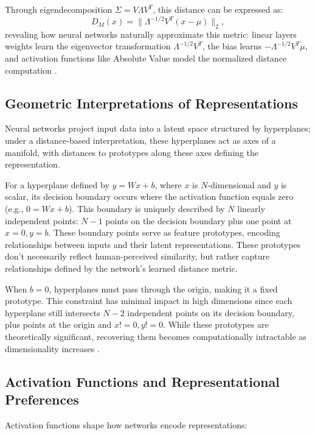 Through eigendecomposition $\Sigma = V\Lambda V^T$, this distance can be expressed as:
\begin{equation}
    D_M(x) = \| \Lambda^{-1/2} V^T (x - \mu) \|_2,
\end{equation}
revealing how neural networks naturally approximate this metric: linear layers weights learn the eigenvector transformation $\Lambda^{-1/2} V^T$, the bias learns $-\Lambda^{-1/2} V^T \mu$, and activation functions like Absolute Value model the normalized distance computation \cite{oursland2024interpreting}.

\subsection{Geometric Interpretations of Representations}

Neural networks project input data into a latent space structured by hyperplanes; under a distance-based interpretation, these hyperplanes act as axes of a manifold, with distances to prototypes along these axes defining the representation.

For a hyperplane defined by $y = Wx + b$, where $x$ is $N$-dimensional and $y$ is scalar, its decision boundary occurs where the activation function equals zero (e.g., $0 = Wx + b$). This boundary is uniquely described by $N$ linearly independent points: $N-1$ points on the decision boundary plus one point at ${x=0, y=b}$. These boundary points serve as feature prototypes, encoding relationships between inputs and their latent representations. These prototypes don't necessarily reflect human-perceived similarity, but rather capture relationships defined by the network's learned distance metric.

When $b=0$, hyperplanes must pass through the origin, making it a fixed prototype. This constraint has minimal impact in high dimensions since each hyperplane still intersects $N-2$ independent points on its decision boundary, plus points at the origin and ${x!=0, y!=0}$. While these prototypes are theoretically significant, recovering them becomes computationally intractable as dimensionality increases \cite{donoho2000high}.

\subsection{Activation Functions and Representational Preferences}

Activation functions shape how networks encode representations:

